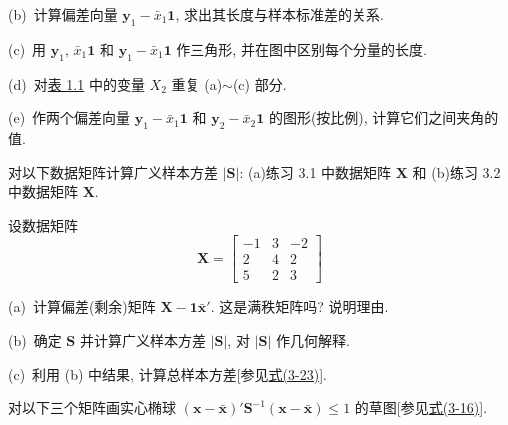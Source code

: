 (b)\ 计算偏差向量 $\mathbf{y}_1-\bar{x}_1\mathbf{1}$, 求出其长度与样本标准差的关系.

(c)\ 用 $\mathbf{y}_1$, $\bar{x}_1\mathbf{1}$ 和 $\mathbf{y}_1-\bar{x}_1\mathbf{1}$ 作三角形, 并在图中区别每个分量的长度.

(d)\ 对\hyperref[tab:1.1]{表 1.1} 中的变量 $X_2$ 重复 (a)$\sim$(c) 部分.

(e)\ 作两个偏差向量 $\mathbf{y}_1-\bar{x}_1\mathbf{1}$ 和 $\mathbf{y}_2-\bar{x}_2\mathbf{1}$ 的图形(按比例), 计算它们之间夹角的值.

\quad 对以下数据矩阵计算广义样本方差 $|\mathbf{S}|$: (a)练习 3.1 中数据矩阵 $\mathbf{X}$ 和 (b)练习 3.2 中数据矩阵 $\mathbf{X}$.

\quad 设数据矩阵
\[
\mathbf{X}=\begin{bmatrix}
-1&3&-2\\
2&4&2\\
5&2&3
\end{bmatrix}
\]

(a)\ 计算偏差(剩余)矩阵 $\mathbf{X}-\mathbf{1}\bar{\mathbf{x}}'$. 这是满秩矩阵吗? 说明理由.

(b)\ 确定 $\mathbf{S}$ 并计算广义样本方差 $|\mathbf{S}|$, 对 $|\mathbf{S}|$ 作几何解释.

(c)\ 利用 (b) 中结果, 计算总样本方差[参见\hyperref[eq:3-23]{式(3-23)}].

\quad 对以下三个矩阵画实心椭球 $(\mathbf{x}-\bar{\mathbf{x}})'\mathbf{S}^{-1}(\mathbf{x}-\bar{\mathbf{x}})\le1$ 的草图[参见\hyperref[eq:3-16]{式(3-16)}].
